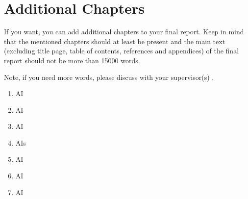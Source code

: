 \chapter{Additional Chapters}\label{chap:additional_chapters}

If you want, you can add additional chapters to your final report. Keep in mind that the mentioned chapters should at least be present and the main text (excluding title page, table of contents, references and appendices) of the final report should not be more than 15000 words.

Note, if you need more words, please discuss with your supervisor(s) \cite{Girshick2015}.

\begin{enumerate}
    \item \gls{AI}
    \item \gls{AI}
    \item \Gls{AI}
    \item \glspl{AI}
    \item \acrshort{AI}
    \item \acrlong{AI}
    \item \acrfull{AI}
\end{enumerate}
